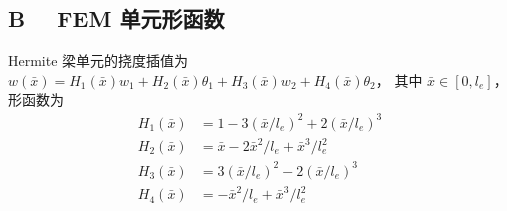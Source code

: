 \documentclass[twoside,12pt]{ctexart}
\begin{document}
\subsection*{B \ \ FEM 单元形函数}

Hermite 梁单元的挠度插值为 $w(\bar{x})=H_1(\bar{x})w_1+H_2(\bar{x})\theta_1
+H_3(\bar{x})w_2+H_4(\bar{x})\theta_2$，
其中 $\bar{x}\in[0,l_e]$，形函数为
\begin{align*}
  H_1(\bar{x}) &= 1-3(\bar{x}/l_e)^2+2(\bar{x}/l_e)^3 \\
  H_2(\bar{x}) &= \bar{x}-2\bar{x}^2/l_e+\bar{x}^3/l_e^2 \\
  H_3(\bar{x}) &= 3(\bar{x}/l_e)^2-2(\bar{x}/l_e)^3 \\
  H_4(\bar{x}) &= -\bar{x}^2/l_e+\bar{x}^3/l_e^2
\end{align*}
\end{document}
